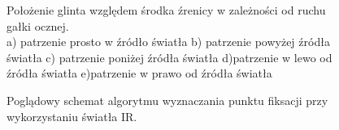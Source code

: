 \documentclass[twoside,a4paper]{book}
\begin{document}
\begin{figure}[!h]
		\centering
		\caption{Położenie glinta względem środka źrenicy w zależności od ruchu gałki ocznej. \\
a) patrzenie prosto w źródło światła b) patrzenie powyżej źródła światła c) patrzenie poniżej źródła światła d)patrzenie w lewo od źródła światła e)patrzenie w prawo od źródła światła 
}
		\label{fig:glint}
	\end{figure}
	
\begin{figure}[!h]

		\centering		
		\caption{Poglądowy schemat algorytmu wyznaczania punktu fiksacji przy wykorzystaniu światła IR. }
		\label{fig:glintUML}
	\end{figure}
	
\end{document}
